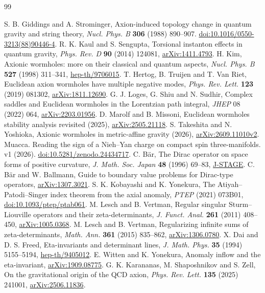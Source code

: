 \begingroup\small
\begin{thebibliography}{99}
\raggedright
{} S. B. Giddings and A. Strominger, Axion-induced topology change in quantum gravity and string theory, \emph{Nucl. Phys. B} \textbf{306} (1988) 890--907. \href{https://doi.org/10.1016/0550-3213(88)90446-4}{doi:10.1016/0550-3213(88)90446-4}.
 R. K. Kaul and S. Sengupta, Torsional instanton effects in quantum gravity, \emph{Phys. Rev. D} \textbf{90} (2014) 124081, \href{https://arxiv.org/abs/1411.4793}{arXiv:1411.4793}.
 H. Kim, Axionic wormholes: more on their classical and quantum aspects, \emph{Nucl. Phys. B} \textbf{527} (1998) 311--341, \href{https://arxiv.org/abs/hep-th/9706015}{hep-th/9706015}.
 T. Hertog, B. Truijen and T. Van Riet, Euclidean axion wormholes have multiple negative modes, \emph{Phys. Rev. Lett.} \textbf{123} (2019) 081302, \href{https://arxiv.org/abs/1811.12690}{arXiv:1811.12690}.
 G. J. Loges, G. Shiu and N. Sudhir, Complex saddles and Euclidean wormholes in the Lorentzian path integral, \emph{JHEP} 08 (2022) 064, \href{https://arxiv.org/abs/2203.01956}{arXiv:2203.01956}.
 D. Marolf and B. Missoni, Euclidean wormholes stability analysis revisited (2025), \href{https://arxiv.org/abs/2505.21118}{arXiv:2505.21118}.
 S. Takeshita and N. Yoshioka, Axionic wormholes in metric-affine gravity (2026), \href{https://arxiv.org/html/2609.11010v2}{arXiv:2609.11010v2}.
 Muacca. Reading the sign of a Nieh--Yan charge on compact spin three-manifolds. v1 (2026). \href{https://doi.org/10.5281/zenodo.24434717}{doi:10.5281/zenodo.24434717}.
 C. B\"ar, The Dirac operator on space forms of positive curvature, \emph{J. Math. Soc. Japan} \textbf{48} (1996) 69--83, \href{https://www.jstage.jst.go.jp/article/jmath1948/48/1/48_1_69/_article/-char/en}{J-STAGE}.
 C. B\"ar and W. Ballmann, Guide to boundary value problems for Dirac-type operators, \href{https://arxiv.org/abs/1307.3021}{arXiv:1307.3021}.
 S. K. Kobayashi and K. Yonekura, The Atiyah--Patodi--Singer index theorem from the axial anomaly, \emph{PTEP} (2021) 073B01, \href{https://doi.org/10.1093/ptep/ptab061}{doi:10.1093/ptep/ptab061}.
 M. Lesch and B. Vertman, Regular singular Sturm--Liouville operators and their zeta-determinants, \emph{J. Funct. Anal.} \textbf{261} (2011) 408--450, \href{https://arxiv.org/abs/1005.0368}{arXiv:1005.0368}.
 M. Lesch and B. Vertman, Regularizing infinite sums of zeta-determinants, \emph{Math. Ann.} \textbf{361} (2015) 835--862, \href{https://arxiv.org/abs/1306.0780}{arXiv:1306.0780}.
 X. Dai and D. S. Freed, Eta-invariants and determinant lines, \emph{J. Math. Phys.} \textbf{35} (1994) 5155--5194, \href{https://arxiv.org/abs/hep-th/9405012}{hep-th/9405012}.
 E. Witten and K. Yonekura, Anomaly inflow and the eta-invariant, \href{https://arxiv.org/abs/1909.08775}{arXiv:1909.08775}.
 G. K. Karananas, M. Shaposhnikov and S. Zell, On the gravitational origin of the QCD axion, \emph{Phys. Rev. Lett.} \textbf{135} (2025) 241001, \href{https://arxiv.org/abs/2506.11836}{arXiv:2506.11836}.
\end{thebibliography}
\endgroup

